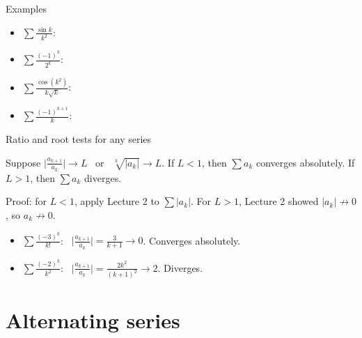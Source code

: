 \documentclass{wosm-slides}
\begin{document}
\begin{frame}{Examples}
  \begin{itemize}
    \item $\displaystyle\sum \frac{\sin k}{k^2}$:
    \item $\displaystyle\sum \frac{(-1)^k}{2^k}$:
    \item $\displaystyle\sum \frac{\cos(k^2)}{k\sqrt{k}}$:
    \item $\displaystyle\sum \frac{(-1)^{k+1}}{k}$:
  \end{itemize}
\end{frame}

\begin{frame}{Ratio and root tests for any series}
  \begin{theorem}
    Suppose $\bigl|\frac{a_{k+1}}{a_k}\bigr| \to L$ \ or \ $\sqrt[k]{|a_k|} \to L$.
    If $L < 1$, then $\sum a_k$ converges absolutely.
    If $L > 1$, then $\sum a_k$ diverges.
  \end{theorem}
  {\small Proof: for $L < 1$, apply Lecture 2 to $\sum |a_k|$. For $L > 1$, Lecture 2
  showed $|a_k| \not\to 0$, so $a_k \not\to 0$.\par}
  \pause
  \begin{example}
    \begin{itemize}
      \item $\sum \frac{(-3)^k}{k!}$: \ $\bigl|\frac{a_{k+1}}{a_k}\bigr| = \frac{3}{k+1} \to 0$.
        Converges absolutely.
      \item $\sum \frac{(-2)^k}{k^2}$: \ $\bigl|\frac{a_{k+1}}{a_k}\bigr| = \frac{2k^2}{(k+1)^2} \to 2$.
        Diverges.
    \end{itemize}
  \end{example}
\end{frame}

\section{Alternating series}
\end{document}
